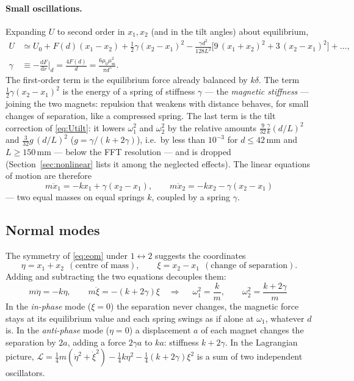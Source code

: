 \documentclass[11pt,a4paper]{article}
\newcommand{\muz}{\mu_0}
\newcommand{\mum}{\mu_{\mathrm m}}
\newcommand{\dd}{\mathrm{d}}
\newcommand{\un}[1]{\,\mathrm{#1}}
\newcommand{\Lag}{\mathcal L}
\begin{document}
\paragraph{Small oscillations.} Expanding $U$ to second order in $x_1,x_2$ (and in the tilt angles) about equilibrium,
\begin{equation}
\begin{aligned}
U&\simeq U_0+F(d)(x_1-x_2)+\tfrac12\gamma(x_2-x_1)^2-\frac{\gamma d^2}{128L^2}\bigl[9\,(x_1+x_2)^2+3\,(x_2-x_1)^2\bigr]+\dots,\\
\gamma&\equiv-\frac{\dd F}{\dd r}\Big|_{d}=\frac{4F(d)}{d}=\frac{6\muz\mum^2}{\pi d^5}.
\end{aligned}
\label{eq:Uquad}
\end{equation}
The first-order term is the equilibrium force already balanced by $k\delta$. The term $\tfrac12\gamma(x_2-x_1)^2$ is the energy of a spring of stiffness $\gamma$ --- the \emph{magnetic stiffness} --- joining the two magnets: repulsion that weakens with distance behaves, for small changes of separation, like a compressed spring. The last term is the tilt correction of \eqref{eq:Utilt}: it lowers $\omega_1^2$ and $\omega_2^2$ by the relative amounts $\frac{9}{32}\frac{\gamma}{k}(d/L)^2$ and $\frac{3}{32}g\,(d/L)^2$ ($g=\gamma/(k+2\gamma)$), i.e.\ by less than $10^{-3}$ for $d\le42\un{mm}$ and $L\ge150\un{mm}$ --- below the FFT resolution --- and is dropped (Section~\ref{sec:nonlinear} lists it among the neglected effects). The linear equations of motion are therefore
\begin{equation}
\boxed{\;m\ddot x_1=-kx_1+\gamma(x_2-x_1),\qquad m\ddot x_2=-kx_2-\gamma(x_2-x_1)\;}
\label{eq:eom}
\end{equation}
--- two equal masses on equal springs $k$, coupled by a spring $\gamma$.

\subsection{Normal modes}\label{sec:modes}

The symmetry of \eqref{eq:eom} under $1\leftrightarrow2$ suggests the coordinates
\begin{equation}
\eta=x_1+x_2\ \ (\text{centre of mass}),\qquad \xi=x_2-x_1\ \ (\text{change of separation}).
\end{equation}
Adding and subtracting the two equations decouples them:
\begin{equation}
m\ddot\eta=-k\eta,\qquad m\ddot\xi=-(k+2\gamma)\xi
\quad\Longrightarrow\quad
\boxed{\;\omega_1^2=\frac km,\qquad \omega_2^2=\frac{k+2\gamma}{m}\;}
\label{eq:modes}
\end{equation}
In the \emph{in-phase} mode ($\xi=0$) the separation never changes, the magnetic force stays at its equilibrium value and each spring swings as if alone at $\omega_1$, whatever $d$ is. In the \emph{anti-phase} mode ($\eta=0$) a displacement $a$ of each magnet changes the separation by $2a$, adding a force $2\gamma a$ to $ka$: stiffness $k+2\gamma$. In the Lagrangian picture, $\Lag=\tfrac14m(\dot\eta^2+\dot\xi^2)-\tfrac14k\eta^2-\tfrac14(k+2\gamma)\xi^2$ is a sum of two independent oscillators.
\end{document}
